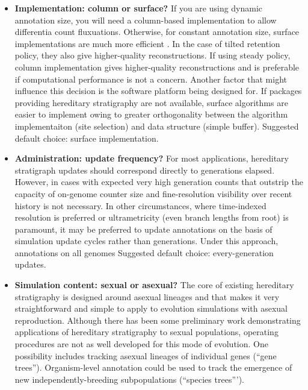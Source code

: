 \begin{itemize}
  In scenarios where explicitly differentiating between founding clades is paramount, 
  \footnote{One possible exception is cases where a global monotonic counter is available and it is desirable to demarcate phylogenetic history in terms of simulation time rather than generations.}
\item \textbf{Implementation: column or surface?}
  If you are using dynamic annotation size, you will need a column-based implementation to allow differentia count fluxuations.
  Otherwise, for constant annotation size, surface implementations are much more efficient \citep{TODOOTHERPAPER}.
  In the case of tilted retention policy, they also give higher-quality reconstructions.
  If using steady policy, column implementation gives higher-quality reconstructions and is preferable if computational performance is not a concern.
  Another factor that might influence this decision is the software platform being designed for.
  If packages providing hereditary stratigraphy are not available, surface algorithms are easier to implement owing to greater orthogonality between the algorithm implementaiton (site selection) and data structure (simple buffer).
  Suggested default choice: surface implementation.
\item \textbf{Administration: update frequency?}
  For most applications, hereditary stratigraph updates should correspond directly to generations elapsed.
  However, in cases with expected very high generation counts that outstrip the capacity of on-genome counter size and fine-resolution visibility over recent history is not necessary.
  In other circumstances, where time-indexed resolution is preferred or ultrametricity (even branch lengths from root) is paramount, it may be preferred to update annotations on the basis of simulation update cycles rather than generations.
  Under this approach, annotations on all genomes
  Suggested default choice: every-generation updates.
\item \textbf{Simulation content: sexual or asexual?}
  The core of existing hereditary stratigraphy is designed around asexual lineages and that makes it very straightforward and simple to apply to evolution simulations with asexual reproduction.
  Although there has been some preliminary work demonstrating applications of hereditary stratigraphy to sexual populations, operating procedures are not as well developed for this mode of evolution.
  One possibility includes tracking asexual lineages of individual genes (``gene trees'').
  Organism-level annotation could be used to track the emergence of new independently-breeding subpopulations (``species trees''').

\end{itemize}
